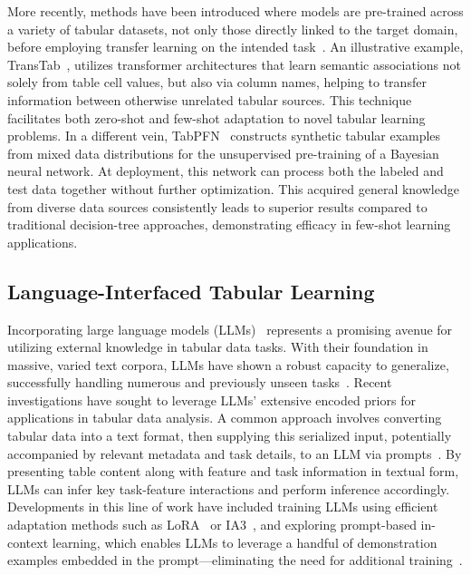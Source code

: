 More recently, methods have been introduced where models are pre-trained across a variety of tabular datasets, not only those directly linked to the target domain, before employing transfer learning on the intended task~\cite{zhang2023generative,levin2022transfer,zhu2023xtab}. An illustrative example, TransTab~\cite{wang2022transtab}, utilizes transformer architectures that learn semantic associations not solely from table cell values, but also via column names, helping to transfer information between otherwise unrelated tabular sources. This technique facilitates both zero-shot and few-shot adaptation to novel tabular learning problems. In a different vein, TabPFN~\cite{hollmann2022tabpfn} constructs synthetic tabular examples from mixed data distributions for the unsupervised pre-training of a Bayesian neural network. At deployment, this network can process both the labeled and test data together without further optimization. This acquired general knowledge from diverse data sources consistently leads to superior results compared to traditional decision-tree approaches, demonstrating efficacy in few-shot learning applications.

\subsection{Language-Interfaced Tabular Learning}

Incorporating large language models (LLMs)~\cite{anil2023palm,openai2023gpt4} represents a promising avenue for utilizing external knowledge in tabular data tasks. With their foundation in massive, varied text corpora, LLMs have shown a robust capacity to generalize, successfully handling numerous and previously unseen tasks~\cite{brown2020language}. Recent investigations have sought to leverage LLMs’ extensive encoded priors for applications in tabular data analysis. A common approach involves converting tabular data into a text format, then supplying this serialized input, potentially accompanied by relevant metadata and task details, to an LLM via prompts~\cite{dinh2022lift,hegselmann2023tabllm,wang2023anypredict}. By presenting table content along with feature and task information in textual form, LLMs can infer key task-feature interactions and perform inference accordingly. Developments in this line of work have included training LLMs using efficient adaptation methods such as LoRA~\cite{hu2021lora} or IA3~\cite{liu2022few}, and exploring prompt-based in-context learning, which enables LLMs to leverage a handful of demonstration examples embedded in the prompt—eliminating the need for additional training~\cite{dinh2022lift,hegselmann2023tabllm,nam2023semi,slack2023tablet}.

